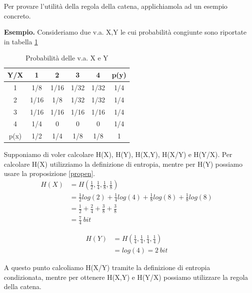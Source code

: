 \bigskip 

\noindent
Per provare l'utilità della regola della catena, applichiamola ad un esempio concreto.

\smallskip
\noindent
\textbf{Esempio.}
Consideriamo due v.a. X,Y le cui probabilità congiunte sono riportate in tabella \ref{tab:catena}

\begin{table}[htbp]
  \begin{center}
   \begin{tabular}{c|cccc|c}
	Y/X & 1 & 2 & 3 & 4 & p(y)\\
       \hline
	1 & 1/8 & 1/16 & 1/32 & 1/32 & 1/4 \\ 
	2 & 1/16 & 1/8 & 1/32 & 1/32 & 1/4 \\ 
	3 & 1/16 & 1/16 & 1/16 & 1/16 & 1/4 \\ 
        4 & 1/4 & 0 & 0 & 0 & 1/4 \\ 
        \hline
        p(x) & 1/2 & 1/4 & 1/8 & 1/8 & 1 \\  
    \end{tabular}
     
     \caption{Probabilità delle v.a. X e Y}
    \label{tab:catena}
  \end{center}
\end{table}

\noindent
Supponiamo di voler calcolare H(X), H(Y), H(X,Y), H(X/Y) e H(Y/X).
Per calcolare H(X) utilizziamo la definizione di entropia, mentre per
H(Y) possiamo usare la proposizione \ref{propen}.
\[
 \begin{split}
 H(X) &= H \left( \frac{1}{2},\frac{1}{4},\frac{1}{8},\frac{1}{8} \right) \\
      &= \frac{1}{2} log(2) + \frac{1}{4} log(4) + \frac{1}{8} log(8) + \frac{1}{8} log(8) \\
      &= \frac{1}{2} + \frac{2}{4} + \frac{3}{8} + \frac{3}{8} \\
      &= \frac{7}{4} \ bit
 \end{split}
\]

\[
 \begin{split}
 H(Y) &= H \left( \frac{1}{4},\frac{1}{4},\frac{1}{4},\frac{1}{4} \right) \\
      &= log(4) = 2 \ bit
 \end{split}
\]

A questo punto calcoliamo H(X/Y) tramite la definizione di entropia condizionata, mentre
per ottenere H(X,Y) e H(Y/X) possiamo utilizzare la regola della catena.

